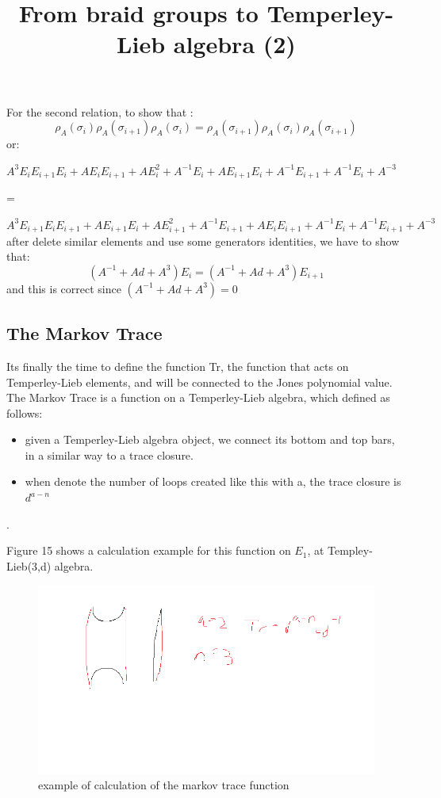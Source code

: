 \documentclass{article}
\begin{document}
\title{From braid groups to Temperley-Lieb algebra (2)}
For the second relation, to show that :
\begin{displaymath}
\rho_{A}(\sigma_{i})\rho_{A}(\sigma_{i+1})\rho_{A}(\sigma_{i})= \rho_{A}(\sigma_{i+1})\rho_{A}(\sigma_{i})\rho_{A}(\sigma_{i+1})
\end{displaymath}
or:

$
A^{3}E_{i}E_{i+1}E_{i} +AE_{i}E_{i+1} + AE_{i}^{2} + A^{-1}E_{i} +AE_{i+1}E_{i}+A^{-1}E_{i+1} + A^{-1}E_{i} + A^{-3}$

=

$
A^{3}E_{i+1}E_{i}E_{i+1} +AE_{i+1}E_{i} + AE_{i+1}^{2} + A^{-1}E_{i+1} +AE_{i}E_{i+1}+A^{-1}E_{i} + A^{-1}E_{i+1} + A^{-3}
$
after delete similar elements and use some generators identities, we have to show that:
\begin{displaymath}
(A^{-1}+Ad+A^{3})E_{i}= (A^{-1}+Ad+A^{3})E_{i+1}
\end{displaymath}
and this is correct since $(A^{-1}+Ad+A^{3}) = 0$

\subsection{The Markov Trace}
Its finally the time to define the function Tr, the function that acts on Temperley-Lieb elements, and will be connected to the Jones polynomial value.
The Markov Trace is a function on a Temperley-Lieb algebra, which defined as follows:
\begin{itemize}
\item given a Temperley-Lieb algebra object, we connect its bottom and top bars, in a similar way to
a trace closure.
\item when denote the number of loops created like this with a, the trace closure is $d^{a-n}$
\end{itemize}.

Figure 15 shows a calculation example for this function on $E_{1}$, at Templey-Lieb(3,d) algebra.

\begin{figure}
\centering
\includegraphics{MarkovTraceExample}
\caption{example of calculation of the markov trace function}
\label{fig:my_label}
\end{figure}
\end{document}
